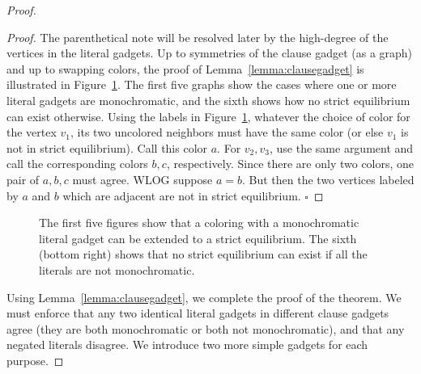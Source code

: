 \documentclass{llncs}
\begin{document}
\begin{proof}
\begin{proof}
The parenthetical note will be resolved later by the high-degree of the vertices
in the literal gadgets. Up to symmetries of the clause gadget (as a graph) and
up to swapping colors, the proof of Lemma~\ref{lemma:clausegadget} is
illustrated in Figure~\ref{fig:clauselemmaproof}. The first five graphs show the
cases where one or more literal gadgets are monochromatic, and the sixth shows
how no strict equilibrium can exist otherwise. Using the labels in
Figure~\ref{fig:clauselemmaproof}, whatever the choice of color for the vertex
$v_1$, its two uncolored neighbors must have the same color (or else $v_1$ is
not in strict equilibrium). Call this color $a$. For $v_2, v_3$, use the same
argument and call the corresponding colors $b, c$, respectively. Since there are
only two colors, one pair of $a,b,c$ must agree.  WLOG suppose $a=b$. But then
the two vertices labeled by $a$ and $b$ which are adjacent are not in strict
equilibrium.  \hfill $\square$ 
\end{proof}

\begin{figure}[h]
\centering
{}
\caption{The first five figures show
that a coloring with a monochromatic literal gadget can be extended to a strict
equilibrium. The sixth (bottom right) shows that no strict equilibrium can
exist if all the literals are not monochromatic.}
\label{fig:clauselemmaproof}
\end{figure}

Using Lemma~\ref{lemma:clausegadget}, we complete the proof of the theorem. We
must enforce that any two identical literal gadgets in different clause gadgets
agree (they are both monochromatic or both not monochromatic), and that any
negated literals disagree. We introduce two more simple gadgets for each
purpose.


\end{proof}
\end{document}
